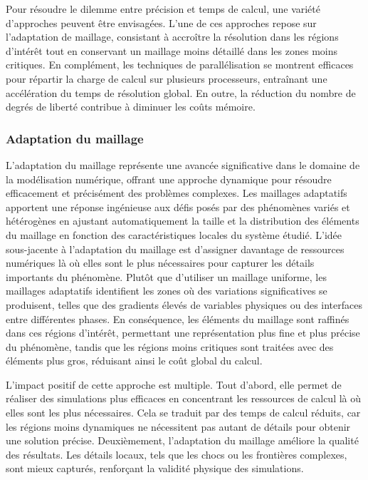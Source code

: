 Pour résoudre le dilemme entre précision et temps de calcul, une variété d'approches peuvent être envisagées. L'une de ces approches repose sur l'adaptation de maillage, consistant à accroître la résolution dans les régions d'intérêt tout en conservant un maillage moins détaillé dans les zones moins critiques. En complément, les techniques de parallélisation se montrent efficaces pour répartir la charge de calcul sur plusieurs processeurs, entraînant une accélération du temps de résolution global. En outre, la réduction du nombre de degrés de liberté contribue à diminuer les coûts mémoire.

\subsubsection{Adaptation du maillage}

L'adaptation du maillage représente une avancée significative dans le domaine de la modélisation numérique, offrant une approche dynamique pour résoudre efficacement et précisément des problèmes complexes. Les maillages adaptatifs apportent une réponse ingénieuse aux défis posés par des phénomènes variés et hétérogènes en ajustant automatiquement la taille et la distribution des éléments du maillage en fonction des caractéristiques locales du système étudié. L'idée sous-jacente à l'adaptation du maillage est d'assigner davantage de ressources numériques là où elles sont le plus nécessaires pour capturer les détails importants du phénomène. Plutôt que d'utiliser un maillage uniforme, les maillages adaptatifs identifient les zones où des variations significatives se produisent, telles que des gradients élevés de variables physiques ou des interfaces entre différentes phases. En conséquence, les éléments du maillage sont raffinés dans ces régions d'intérêt, permettant une représentation plus fine et plus précise du phénomène, tandis que les régions moins critiques sont traitées avec des éléments plus gros, réduisant ainsi le coût global du calcul.

L'impact positif de cette approche est multiple. Tout d'abord, elle permet de réaliser des simulations plus efficaces en concentrant les ressources de calcul là où elles sont les plus nécessaires. Cela se traduit par des temps de calcul réduits, car les régions moins dynamiques ne nécessitent pas autant de détails pour obtenir une solution précise. Deuxièmement, l'adaptation du maillage améliore la qualité des résultats. Les détails locaux, tels que les chocs ou les frontières complexes, sont mieux capturés, renforçant la validité physique des simulations.

